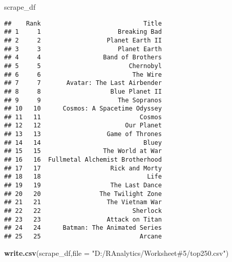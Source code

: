 \documentclass[
]{article}
\newenvironment{Shaded}{\begin{snugshade}}{\end{snugshade}}
\newcommand{\AttributeTok}[1]{\textcolor[rgb]{0.13,0.29,0.53}{#1}}
\newcommand{\FunctionTok}[1]{\textcolor[rgb]{0.13,0.29,0.53}{\textbf{#1}}}
\newcommand{\NormalTok}[1]{#1}
\newcommand{\StringTok}[1]{\textcolor[rgb]{0.31,0.60,0.02}{#1}}
\begin{document}
\begin{Shaded}
\begin{Highlighting}[]
\NormalTok{scrape\_df}
\end{Highlighting}
\end{Shaded}

\begin{verbatim}
##    Rank                            Title
## 1     1                     Breaking Bad
## 2     2                  Planet Earth II
## 3     3                     Planet Earth
## 4     4                 Band of Brothers
## 5     5                        Chernobyl
## 6     6                         The Wire
## 7     7       Avatar: The Last Airbender
## 8     8                   Blue Planet II
## 9     9                     The Sopranos
## 10   10      Cosmos: A Spacetime Odyssey
## 11   11                           Cosmos
## 12   12                       Our Planet
## 13   13                  Game of Thrones
## 14   14                            Bluey
## 15   15                 The World at War
## 16   16  Fullmetal Alchemist Brotherhood
## 17   17                   Rick and Morty
## 18   18                             Life
## 19   19                   The Last Dance
## 20   20                The Twilight Zone
## 21   21                  The Vietnam War
## 22   22                         Sherlock
## 23   23                  Attack on Titan
## 24   24      Batman: The Animated Series
## 25   25                           Arcane
\end{verbatim}

\begin{Shaded}
\begin{Highlighting}[]
\FunctionTok{write.csv}\NormalTok{(scrape\_df,}\AttributeTok{file =} \StringTok{"D:/RAnalytics/Worksheet\#5/top250.csv"}\NormalTok{)}
\end{Highlighting}
\end{Shaded}
\end{document}
